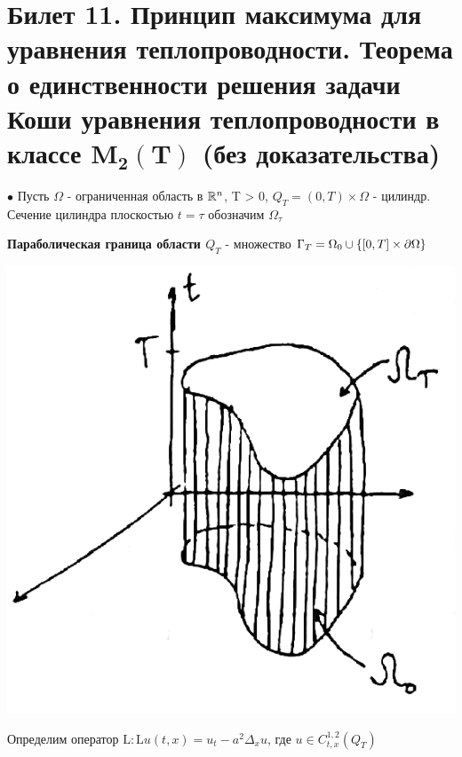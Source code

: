 

\section{Билет 11. Принцип максимума для уравнения теплопроводности. Теорема о единственности решения задачи Коши уравнения теплопроводности в классе $\mathbf{M_2(T)}$ (без доказательства) }
$\bullet$ Пусть $\Omega$ - ограниченная область в $\mathbb{R}^n$, T > 0, 
$Q_T = (0,T) \times \Omega$ - цилиндр. Сечение цилиндра плоскостью $t = \tau$ обозначим $\Omega_\tau$

\begin{definition}
{\bf Параболическая граница области $Q_T$} - множество $\Gamma_T = \Omega_0 \cup \{[0,T] \times \partial{\Omega} \}$
\end{definition}
\begin{center}
\includegraphics[scale=0.5]{11_1_new}
\end{center}

Определим оператор $\mathrm{L} : \mathrm{L}u(t,x) = u_t - a^2 \Delta_xu$, где 
$u \in C_{t, x}^{1,2}(Q_T)$


